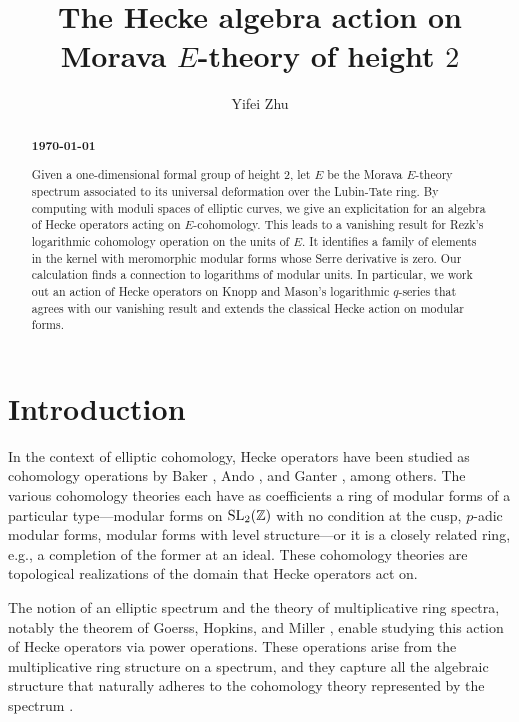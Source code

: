 \documentclass{gtpart}
\title{The Hecke algebra action on Morava $E$-theory of height $2$}
\author{Yifei Zhu}
\theoremstyle{definition}
\theoremstyle{remark}
\newcommand{\mb}[1]{\mathbb{#1}}
\newcommand{\BZ}{{\mb Z}}
\renewcommand{\=}{\approx}
\renewcommand{\-}{\sim}
\newcommand{\SL}{{\rm SL}}
\numberwithin{equation}{section}
\numberwithin{thm}{section}
\begin{document}
\begin{abstract}
 \centerline{\textbf{\today}}\vspace{.5in}

 Given a one-dimensional formal group of height 2, 
 let $E$ be the Morava $E$-theory spectrum associated to its universal deformation over the Lubin-Tate ring.  
 By computing with moduli spaces of elliptic curves, 
 we give an explicitation for an algebra of Hecke operators acting on $E$-cohomology.  
 This leads to a vanishing result for Rezk's logarithmic cohomology operation on the units of $E$.  
 It identifies a family of elements in the kernel with meromorphic modular forms whose Serre derivative is zero.  
 Our calculation finds a connection to logarithms of modular units.  
 In particular, we work out an action of Hecke operators on Knopp and Mason's logarithmic $q$-series 
 that agrees with our vanishing result and extends the classical Hecke action on modular forms.  
\end{abstract}

\maketitle



\section{Introduction}

In the context of elliptic cohomology, Hecke operators have been studied as cohomology 
operations by Baker \cite{Baker90,Baker89}, Ando \cite{Ando95}, and 
Ganter \cite{stringy}, among others.  The various cohomology theories each have 
as coefficients a ring of modular forms 
of a particular type---modular forms on $\SL_2(\BZ)$ with no condition at the cusp, 
$p$-adic modular forms, modular forms with level structure---or it is a 
closely related ring, e.g., a completion of the former at an ideal.  These cohomology 
theories are topological realizations of the domain that Hecke operators act on.  

The notion of an elliptic spectrum \cite[Definition 1.2]{AHS01} and the theory of multiplicative ring 
spectra, notably the theorem of Goerss, Hopkins, and Miller \cite[Corollary 7.6]{GH}, enable 
studying this action of Hecke operators via power operations.  
These operations arise from the multiplicative ring structure on a spectrum, 
and they capture all the algebraic structure that naturally adheres to the cohomology theory represented by the spectrum \cite{H_infty}.  
\end{document}
